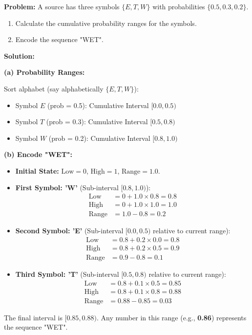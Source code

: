 \documentclass[12pt,a4paper]{article}
\begin{document}
\begin{tcolorbox}[examplebox, title={Worked Example: Arithmetic Coding of "WET"}]
\textbf{Problem:} A source has three symbols $\{E, T, W\}$ with probabilities $\{0.5, 0.3, 0.2\}$.
\begin{enumerate}[label=\alph*., leftmargin=*, itemsep=1pt, topsep=1pt]
  \item Calculate the cumulative probability ranges for the symbols.
  \item Encode the sequence "WET".
\end{enumerate}
\textbf{Solution:}

\textbf{(a) Probability Ranges:}\par\noindent
Sort alphabet (say alphabetically $\{E, T, W\}$):
\begin{itemize}[leftmargin=*, itemsep=1pt]
  \item Symbol $E$ (prob = 0.5): Cumulative Interval $[0.0, 0.5)$
  \item Symbol $T$ (prob = 0.3): Cumulative Interval $[0.5, 0.8)$
  \item Symbol $W$ (prob = 0.2): Cumulative Interval $[0.8, 1.0)$
\end{itemize}

\textbf{(b) Encode "WET":}
\begin{itemize}[leftmargin=*, itemsep=3pt]
  \item \textbf{Initial State:} $\text{Low} = 0$, $\text{High} = 1$, $\text{Range} = 1.0$.
  \item \textbf{First Symbol: 'W'} (Sub-interval $[0.8, 1.0)$):
    \begin{align*}
      \text{Low} &= 0 + 1.0 \times 0.8 = 0.8 \\
      \text{High} &= 0 + 1.0 \times 1.0 = 1.0 \\
      \text{Range} &= 1.0 - 0.8 = 0.2
    \end{align*}
  \item \textbf{Second Symbol: 'E'} (Sub-interval $[0.0, 0.5)$ relative to current range):
    \begin{align*}
      \text{Low} &= 0.8 + 0.2 \times 0.0 = 0.8 \\
      \text{High} &= 0.8 + 0.2 \times 0.5 = 0.9 \\
      \text{Range} &= 0.9 - 0.8 = 0.1
    \end{align*}
  \item \textbf{Third Symbol: 'T'} (Sub-interval $[0.5, 0.8)$ relative to current range):
    \begin{align*}
      \text{Low} &= 0.8 + 0.1 \times 0.5 = 0.85 \\
      \text{High} &= 0.8 + 0.1 \times 0.8 = 0.88 \\
      \text{Range} &= 0.88 - 0.85 = 0.03
    \end{align*}
\end{itemize}
The final interval is $[0.85, 0.88)$. Any number in this range (e.g., \textbf{0.86}) represents the sequence "WET".
\end{tcolorbox}
\end{document}
